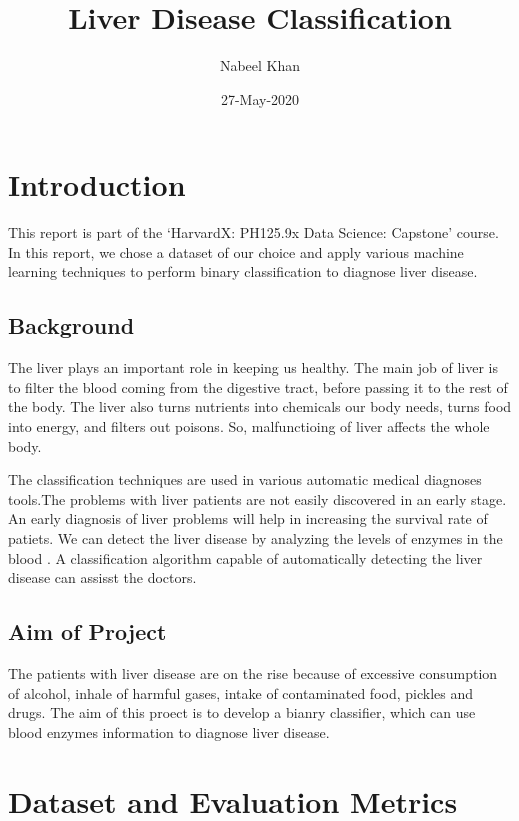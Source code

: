 \documentclass[]{article}
\title{Liver Disease Classification}
\author{Nabeel Khan}
\date{27-May-2020}
\begin{document}
\maketitle

{
\setcounter{tocdepth}{2}
\tableofcontents
}
\section{Introduction}
\label{sec:introduction}

This report is part of the `HarvardX: PH125.9x Data Science: Capstone'
course. In this report, we chose a dataset of our choice and apply
various machine learning techniques to perform binary classification to
diagnose liver disease.

\subsection{Background}
\label{sec:background}

The liver plays an important role in keeping us healthy. The main job of
liver is to filter the blood coming from the digestive tract, before
passing it to the rest of the body. The liver also turns nutrients into
chemicals our body needs, turns food into energy, and filters out
poisons. So, malfunctioing of liver affects the whole body.

The classification techniques are used in various automatic medical
diagnoses tools\cite{cad}.The problems with liver patients are not
easily discovered in an early stage. An early diagnosis of liver
problems will help in increasing the survival rate of patiets. We can
detect the liver disease by analyzing the levels of enzymes in the blood
\cite{ld,bendi}. A classification algorithm capable of automatically
detecting the liver disease can assisst the doctors.

\subsection{Aim of Project}
\label{sec:aim}

The patients with liver disease are on the rise because of excessive
consumption of alcohol, inhale of harmful gases, intake of contaminated
food, pickles and drugs. The aim of this proect is to develop a bianry
classifier, which can use blood enzymes information to diagnose liver
disease.

\section{Dataset and Evaluation Metrics}
\label{sec:dataset}
\end{document}
